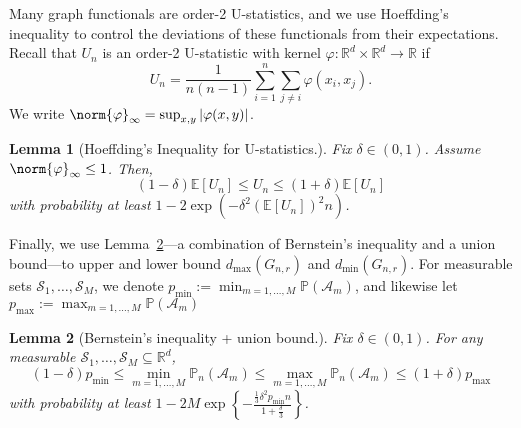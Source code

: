 \documentclass{article}
\newcommand{\Reals}{\mathbb{R}}
\newcommand{\1}{\mathbf{1}}
\newcommand{\Rd}{\Reals^d}
\newcommand{\mc}[1]{\mathcal{#1}}
\newcommand{\Pbb}{\mathbb{P}}
\newtheorem{lemma}{Lemma}[section]
\theoremstyle{definition}
\theoremstyle{remark}
\begin{document}
Many graph functionals are order-2 U-statistics, and we use Hoeffding's inequality to control the deviations of these functionals from their expectations. Recall that $U_n$ is an order-2 U-statistic with kernel $\varphi: \Rd \times \Rd \to \Reals$ if 
\begin{equation*}
U_n = \frac{1}{n(n-1)}\sum_{i = 1}^{n} \sum_{j \neq i} \varphi(x_i,x_j).
\end{equation*}
We write $\norm{\varphi}_{\infty} = \sup_{x,y} |\varphi(x,y)|$. 
\begin{lemma}[Hoeffding's Inequality for U-statistics.]
	\label{lem:hoeffding}
	Fix $\delta \in (0,1)$. Assume $\norm{\varphi}_{\infty} \leq 1$. Then,
	\begin{equation*}
	(1 - \delta) \mathbb{E}[U_n] \leq U_n \leq (1 + \delta) \mathbb{E}[U_n]
	\end{equation*}
	with probability at least $1 - 2 \exp\left(-\delta^2 (\mathbb{E}[U_n])^2 n\right)$.
\end{lemma}

Finally, we use Lemma~\ref{lem:bernstein_union}---a combination of Bernstein's inequality and a union bound---to upper and lower bound $d_{\max}(G_{n,r})$ and $d_{\min}(G_{n,r})$. For measurable sets $\mc{S}_1,\ldots,\mc{S}_M$, we denote $p_{\min} := \min_{m = 1,\ldots,M} \Pbb(\mathcal{A}_m)$, and likewise let $p_{\max} := \max_{m = 1,\ldots,M} \Pbb(\mathcal{A}_m)$
\begin{lemma}[Bernstein's inequality + union bound.]
	\label{lem:bernstein_union}
	Fix $\delta \in (0,1)$. For any measurable $\mathcal{S}_1,\ldots,\mathcal{S}_M \subseteq \Rd$, 
	\begin{equation*}
	(1 - \delta) p_{\min} \leq \min_{m = 1,\ldots,M} \Pbb_n(\mathcal{A}_m) \leq \max_{m = 1,\ldots,M}  \Pbb_n(\mathcal{A}_m) \leq (1 + \delta) p_{\max}
	\end{equation*}
	with probability at least $1 - 2 M \exp\left\{-\frac{\frac{1}{3}\delta^2p_{\min}n}{1 + \frac{\delta}{3}}\right\}$.  
\end{lemma}
\end{document}
